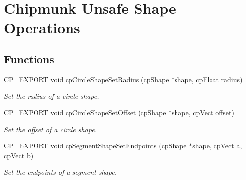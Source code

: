 \hypertarget{group__unsafe}{}\section{Chipmunk Unsafe Shape Operations}
\label{group__unsafe}
\subsection*{Functions}
\begin{DoxyCompactItemize}
\item 
\mbox{\label{group__unsafe_ga3e15a724d3181b3a896816e9eeaadc40}} 
C\+P\+\_\+\+E\+X\+P\+O\+RT void \mbox{\hyperlink{group__unsafe_ga3e15a724d3181b3a896816e9eeaadc40}{cp\+Circle\+Shape\+Set\+Radius}} (\mbox{\hyperlink{structcp_shape}{cp\+Shape}} $\ast$shape, \mbox{\hyperlink{group__basic_types_gac1ed65573e035bf892505768c852d8d3}{cp\+Float}} radius)
\begin{DoxyCompactList}\small\item\em Set the radius of a circle shape. \end{DoxyCompactList}\item 
\mbox{\label{group__unsafe_gad10b3edd28599778cc1109b0105bbd8a}} 
C\+P\+\_\+\+E\+X\+P\+O\+RT void \mbox{\hyperlink{group__unsafe_gad10b3edd28599778cc1109b0105bbd8a}{cp\+Circle\+Shape\+Set\+Offset}} (\mbox{\hyperlink{structcp_shape}{cp\+Shape}} $\ast$shape, \mbox{\hyperlink{structcp_vect}{cp\+Vect}} offset)
\begin{DoxyCompactList}\small\item\em Set the offset of a circle shape. \end{DoxyCompactList}\item 
\mbox{\label{group__unsafe_gaf88e902637a060c22763fd8821ae3344}} 
C\+P\+\_\+\+E\+X\+P\+O\+RT void \mbox{\hyperlink{group__unsafe_gaf88e902637a060c22763fd8821ae3344}{cp\+Segment\+Shape\+Set\+Endpoints}} (\mbox{\hyperlink{structcp_shape}{cp\+Shape}} $\ast$shape, \mbox{\hyperlink{structcp_vect}{cp\+Vect}} a, \mbox{\hyperlink{structcp_vect}{cp\+Vect}} b)
\begin{DoxyCompactList}\small\item\em Set the endpoints of a segment shape. \end{DoxyCompactList}\item 

\end{DoxyCompactItemize}
